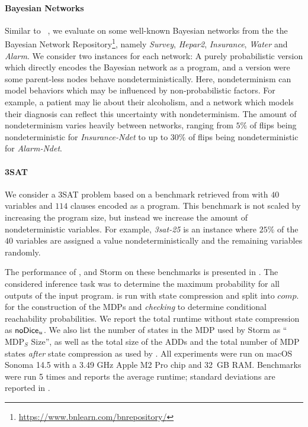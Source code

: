 \paragraph{Bayesian Networks}
Similar to \DICE~\cite{holtzen2020scaling}, we evaluate \NDICE on some well-known Bayesian networks from the the Bayesian Network Repository\footnote{\url{https://www.bnlearn.com/bnrepository/}}, namely \textit{Survey}, \textit{Hepar2}, \textit{Insurance}, \textit{Water} and \textit{Alarm}.
We consider two instances for each network: A purely probabilistic version which directly encodes the Bayesian network as a \NDICE program, and a version were some parent-less nodes behave nondeterministically.
Here, nondeterminism can model behaviors which may be influenced by non-probabilistic factors.
For example, a  patient may lie about their alcoholism, and a network which models their diagnosis can reflect this uncertainty with nondeterminism.
The amount of nondeterminism varies heavily between networks, ranging from $5\%$ of flips being nondeterministic for \textit{Insurance-Ndet} to up to $30\%$ of flips being nondeterministic for \textit{Alarm-Ndet}.

\paragraph{3SAT} 
We consider a 3SAT problem based on a benchmark retrieved from \citet{hoos2000satlib}
with $40$ variables and $114$ clauses encoded as a \NDICE program.
This benchmark is not scaled by increasing the program size, but instead we increase the amount of nondeterministic variables. 
For example, \textit{3sat-25} is an instance where $25\%$ of the $40$ variables are assigned a value nondeterministically and the remaining variables randomly.
\medskip


The performance of \DICE, \NDICE and Storm on these benchmarks is presented in .
The considered inference task was to determine the maximum probability for all outputs of the input program.
\NDICE is run with state compression and split into $\mathit{comp.}$ for the construction of the MDPs and \textit{checking} to determine conditional reachability probabilities.
We report the total runtime without state compression as $\textsf{\upshape {\mbox{noDice}}}_u$.
We also list the number of states in the MDP used by Storm as \enquote{$\text{MDP}_S$ Size}, as well as the total size of the ADDs and the total number of MDP states \emph{after} state compression as used by \NDICE.
All experiments were run on macOS Sonoma 14.5 with a 3.49 GHz Apple M2 Pro chip and 32~GB RAM.
Benchmarks were run 5 times and  reports the average runtime; standard deviations are reported in .

